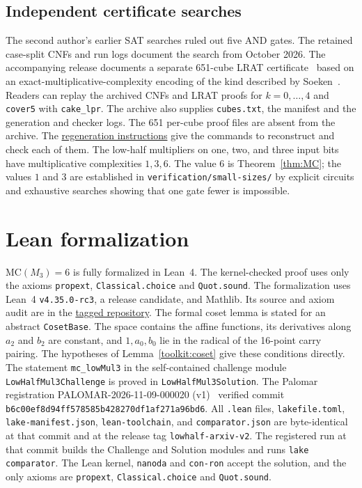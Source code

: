 \documentclass[11pt,a4paper]{article}
\theoremstyle{plain}
\theoremstyle{remark}
\theoremstyle{plain}
\newcommand{\LeanReleaseStatus}{$\mathrm{MC}(M_3)=6$ is fully formalized in Lean~4.
  The kernel-checked proof uses only the axioms \texttt{propext},
  \texttt{Classical.choice} and \texttt{Quot.sound}.}
\begin{document}
\subsection{Independent certificate searches}
The second author's earlier SAT searches ruled out five AND gates. The retained case-split CNFs and run logs document the search from October 2026. The accompanying release documents a separate 651-cube LRAT certificate~\cite{cert} based on an exact-multiplicative-complexity encoding of the kind described by Soeken~\cite{soeken}. Readers can replay the archived CNFs and LRAT proofs for $k=0,\ldots,4$ and \texttt{cover5} with \texttt{cake\_lpr}. The archive also supplies \texttt{cubes.txt}, the manifest and the generation and checker logs. The 651 per-cube proof files are absent from the archive. The \href{https://github.com/bishara74/lowhalf-mul3/blob/lowhalf-arxiv-v2/verification/certificates/REGENERATE.md}{regeneration instructions} give the commands to reconstruct and check each of them. The low-half multipliers on one, two, and three input bits have multiplicative complexities $1,3,6$. The value $6$ is Theorem~\ref{thm:MC}; the values $1$ and $3$ are established in \texttt{verification/small-sizes/} by explicit circuits and exhaustive searches showing that one gate fewer is impossible.

\section{Lean formalization}\label{sec:lean}
\LeanReleaseStatus{}
The formalization uses Lean~4 \texttt{v4.35.0-rc3}, a release candidate, and
Mathlib. Its source and axiom audit are in the
\href{https://github.com/bishara74/lowhalf-mul3/tree/lowhalf-arxiv-v2}{tagged repository}.
The formal coset lemma is stated for an abstract \texttt{CosetBase}.
The space contains the affine functions, its derivatives along $a_2$ and $b_2$
are constant, and $1,a_0,b_0$ lie in the radical of the 16-point carry pairing.
The hypotheses of Lemma~\ref{toolkit:coset} give these conditions directly.
The statement \nolinkurl{mc_lowMul3} in the self-contained challenge module
\nolinkurl{LowHalfMul3Challenge} is proved in \nolinkurl{LowHalfMul3Solution}.
The Palomar registration PALOMAR-2026-11-09-000020 (v1)~\cite{palomar}
verified commit \texttt{b6c00ef8d94ff578585b428270df1af271a96bd6}.
All \texttt{.lean} files, \texttt{lakefile.toml}, \texttt{lake-manifest.json},
\texttt{lean-toolchain}, and \texttt{comparator.json} are byte-identical
at that commit and at the release tag \texttt{lowhalf-arxiv-v2}.
The registered run at that commit builds the Challenge and Solution modules and runs
\texttt{lake comparator}. The Lean kernel, \texttt{nanoda} and \texttt{con-ron}
accept the solution, and the only axioms are \texttt{propext},
\texttt{Classical.choice} and \texttt{Quot.sound}.
\end{document}
